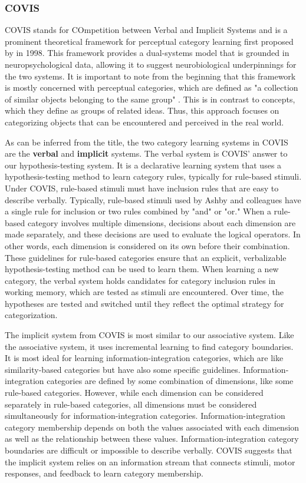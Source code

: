 \documentclass[../dissertation.tex]{subfiles}
\begin{document}
\subsubsection{COVIS}
COVIS stands for COmpetition between Verbal and Implicit Systems and is a prominent theoretical framework for perceptual category learning first proposed by \citeauthor{Ashby1998} in 1998. This framework provides a dual-systems model that is grounded in neuropsychological data, allowing it to suggest neurobiological underpinnings for the two systems. It is important to note from the beginning that this framework is mostly concerned with perceptual categories, which are defined as "a collection of similar objects belonging to the same group" \citep[~p. 151]{Ashby2005}. This is in contrast to concepts, which they define as groups of related ideas. Thus, this approach focuses on categorizing objects that can be encountered and perceived in the real world. \par
	As can be inferred from the title, the two category learning systems in COVIS are the \textbf{verbal} and \textbf{implicit} systems. The verbal system is COVIS' answer to our hypothesis-testing system. It is a declarative learning system that uses a hypothesis-testing method to learn category rules, typically for rule-based stimuli. Under COVIS, rule-based stimuli must have inclusion rules that are easy to describe verbally. Typically, rule-based stimuli used by Ashby and colleagues have a single rule for inclusion or two rules combined by "and" or "or."  When a rule-based category involves multiple dimensions, decisions about each dimension are made separately, and these decisions are used to evaluate the logical operators. In other words, each dimension is considered on its own before their combination. These guidelines for rule-based categories ensure that an explicit, verbalizable hypothesis-testing method can be used to learn them. When learning a new category, the verbal system holds candidates for category inclusion rules in working memory, which are tested as stimuli are encountered. Over time, the hypotheses are tested and switched until they reflect the optimal strategy for categorization. \par
	The implicit system from COVIS is most similar to our associative system. Like the associative system, it uses incremental learning to find category boundaries. It is most ideal for learning information-integration categories, which are like similarity-based categories but have also some specific guidelines. Information-integration categories are defined by some combination of dimensions, like some rule-based categories. However, while each dimension can be considered separately in rule-based categories, all dimensions must be considered simultaneously for information-integration categories. Information-integration category membership depends on both the values associated with each dimension as well as the relationship between these values. Information-integration category boundaries are difficult or impossible to describe verbally. COVIS suggests that the implicit system relies on an information stream that connects stimuli, motor responses, and feedback to learn category membership. \par
\end{document}
